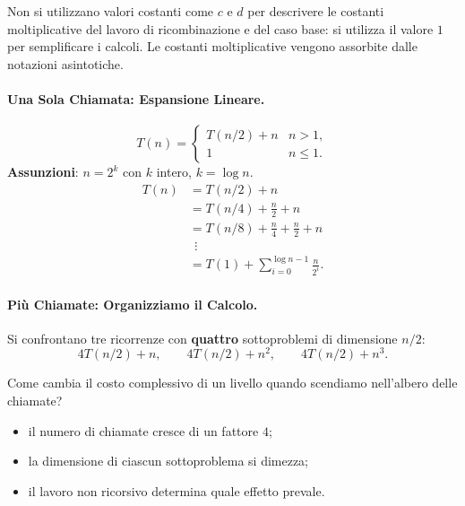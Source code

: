 \documentclass[12pt, a4paper]{article}
\begin{document}
\begin{tcolorbox}[colback=lightergray!5, colframe=tocsubsec, title=\textbf{Semplificazione Adottata nel Seguito}]
Non si utilizzano valori costanti come $c$ e $d$ per descrivere le costanti moltiplicative del lavoro di ricombinazione e del caso base: si utilizza il valore $1$ per semplificare i calcoli. Le costanti moltiplicative vengono assorbite dalle notazioni asintotiche.
\end{tcolorbox}

\paragraph{Una Sola Chiamata: Espansione Lineare.}
$$T(n) = \begin{cases} T(n/2) + n & n>1, \\ 1 & n\le 1. \end{cases}$$
\textbf{Assunzioni}: $n=2^k$ con $k$ intero, $k=\log n$.
\begin{align*}
T(n) &= T(n/2) + n \\
     &= T(n/4) + \frac{n}{2} + n \\
     &= T(n/8) + \frac{n}{4} + \frac{n}{2} + n \\
     &\ \ \vdots \\
     &= T(1) + \sum_{i=0}^{\log n - 1} \frac{n}{2^i}.
\end{align*}

\paragraph{Più Chiamate: Organizziamo il Calcolo.}
Si confrontano tre ricorrenze con \textbf{quattro} sottoproblemi di dimensione $n/2$:
$$4T(n/2)+n, \qquad 4T(n/2)+n^2, \qquad 4T(n/2)+n^3.$$

\begin{tcolorbox}[colback=lightergray!5, colframe=tocsubsec, title=\textbf{La Domanda Decisiva}]
Come cambia il costo complessivo di un livello quando scendiamo nell'albero delle chiamate?
\begin{itemize}
    \item il numero di chiamate cresce di un fattore $4$;
    \item la dimensione di ciascun sottoproblema si dimezza;
    \item il lavoro non ricorsivo determina quale effetto prevale.
\end{itemize}
\end{tcolorbox}
\end{document}
